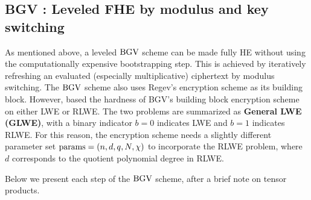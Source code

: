 \documentclass[../main.tex]{subfiles}
\begin{document}
\subsection{BGV : Leveled FHE by modulus and key switching}

As mentioned above, a leveled $\text{BGV}$ scheme can be made fully HE without using the computationally expensive bootstrapping step. This is achieved by iteratively refreshing an evaluated (especially multiplicative) ciphertext by modulus switching. 
The $\text{BGV}$ scheme also uses Regev's encryption scheme as its building block. %
However, \cite{brakerski2014leveled} based the hardness of BGV's building block encryption scheme on either LWE or RLWE. The two problems are summarized as \textbf{General LWE (GLWE)}, with a binary indicator $b=0$ indicates LWE and $b=1$ indicates RLWE. For this reason, the encryption scheme needs a slightly different parameter set $\text{params}=(n,d,q,N,\chi)$ to incorporate the RLWE problem, where $d$ corresponds to the quotient polynomial degree in RLWE. 


Below we present each step of the $\text{BGV}$ scheme, after a brief note on tensor products.
\end{document}
